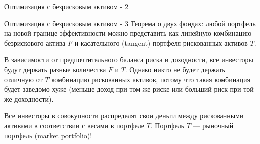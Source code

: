 \documentclass{beamer}
\begin{document}
\newcommand{\drawPortfolioNodeTwo}[6]{
\node[anchor=#6] at (axis cs: #1, #2) {
		\scriptsize 
		\setlength\tabcolsep{2pt}
		\begin{tabular}{|l|r|}
		\hline
		\multicolumn{2}{|c|}{#3} \\ \hline
		Портф. T & #4\% \\
		Безриск. & #5\% \\
		\hline
		\end{tabular}
	};
	\node[circle, fill, inner sep=2pt, color=Set1-B] at (axis cs:#1, #2) {};
}

\begin{frame}{Оптимизация с безрисковым активом - 2}
\centering
{}
\end{frame}



\begin{frame}{Оптимизация с безрисковым активом - 3}
\justify
Теорема о двух фондах: любой портфель на новой границе эффективности можно представить как линейную комбинацию безрискового актива $F$ и касательного (tangent) портфеля рискованных активов $T$.

\vspace{\baselineskip}
В зависимости от предпочтительного баланса риска и доходности, все инвесторы будут держать разные количества $F$ и $T$. Однако никто не будет держать отличную от $T$ комбинацию рискованных активов, потому что такая комбинация будет заведомо хуже (меньше доход при том же риске или больший риск при той же доходности).

\vspace{\baselineskip}
Все инвесторы в совокупности распределят свои деньги между рискованными активами в соответствии с весами в портфеле $T$. Портфель $T$ --- рыночный портфель (market portfolio)!
\end{frame}
\end{document}

